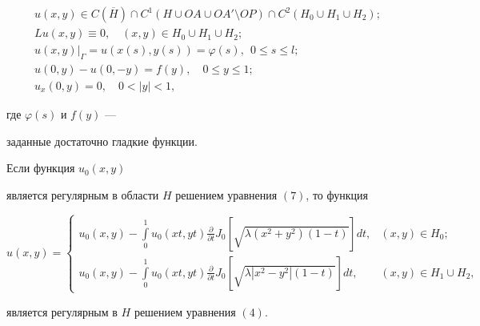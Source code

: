 \begin{gather}


u(x,y) \in C(\overline H)\cap C^1(H\cup OA\cup OA'\setminus OP)


\cap C^2(H_0\cup H_1\cup H_2);\\


%


Lu(x,y)\equiv 0, \quad (x,y)\in H_0\cup H_1\cup H_2;\\


%


u(x,y)\big|_\Gamma=u(x(s),y(s))=\varphi (s),


\ \ 0\le s\le l;\\


%


u(0,y)-u(0,-y)=f(y),\quad 0\le y\le 1;\\


%


u_x(0,y)=0,\quad 0<|y|<1,


\end{gather}


где $\varphi (s)$ и $f(y)$ ---


заданные достаточно гладкие функции.





\begin{lem}


Если функция $u_0(x,y)$


является регулярным в области $H$ решением уравнения $(7)$, то функция


\begin{equation}


u(x,y)=\begin{cases}


u_0(x,y)-\int\limits_0^1 u_0(xt,yt)\frac {\partial }


{\partial t}J_0[\sqrt {\lambda (x^2+y^2)(1-t)}]dt, & (x,y)\in H_0;\\[2mm]


%


u_0(x,y)-\int \limits_0^1 u_0(xt,yt)\frac {\partial }


{\partial t}J_0[\sqrt {\lambda |x^2-y^2|(1-t)}]dt, & (x,y)\in H_1\cup H_2,


\end{cases}


\end{equation}


является регулярным в $H$ решением уравнения $(4)$.


\end{lem}





